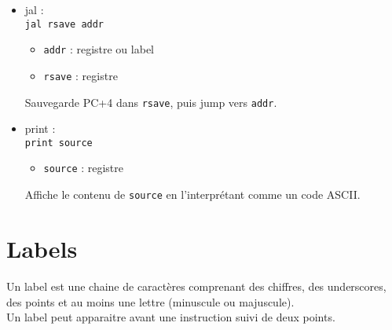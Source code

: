 \documentclass[a4paper]{article}
\begin{document}
\begin{itemize}
        \item jal :\\
        \texttt{jal rsave addr}
        \begin{itemize}
            \item \texttt{addr} : registre ou label
            \item \texttt{rsave} : registre
        \end{itemize}
        Sauvegarde PC+4 dans \texttt{rsave}, puis jump vers \texttt{addr}.

        \item print :\\
        \texttt{print source}
        \begin{itemize}
            \item \texttt{source} : registre
        \end{itemize}
        Affiche le contenu de \texttt{source} en l'interprétant comme un code ASCII.
    \end{itemize}

    \section{Labels}
    Un label est une chaine de caractères comprenant des chiffres, 
    des underscores, des points et au moins une lettre (minuscule ou majuscule).\\
    Un label peut apparaitre avant une instruction suivi de deux points.
\end{document}
